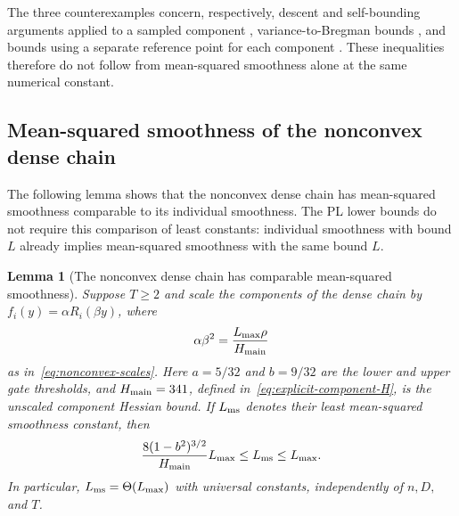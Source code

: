 \documentclass{article}
\newtheorem{lemma}[theorem]{Lemma}
\theoremstyle{definition}
\begin{document}
The three counterexamples concern, respectively, descent and self-bounding
arguments applied to a sampled component
\citep{vaswani2019painless,loizou2021stochastic,mishchenko2020random,kavis2022adaspider},
variance-to-Bregman bounds \citep{liu2022adaptive}, and bounds using
a separate reference point for each component \citep[Lemma~2]{defazio2014saga}.  These inequalities therefore do not
follow from mean-squared smoothness alone at the same numerical constant.

\subsection{Mean-squared smoothness of the nonconvex dense chain}

The following lemma shows that the nonconvex dense chain has mean-squared
smoothness comparable to its individual smoothness.  The PL lower bounds do
not require this comparison of least constants: individual smoothness with
bound $L$ already implies mean-squared smoothness with the same bound $L$.

\begin{lemma}[The nonconvex dense chain has comparable mean-squared smoothness]
\label{lem:dense-chain-ms}
Suppose $T\ge2$ and scale the components of the dense chain by
$f_i(y)=\alpha R_i(\beta y)$, where
\begin{equation}
 \alpha\beta^2=\frac{L_{\max}\rho}{H_{\rm main}}
 \label{eq:dense-chain-local-scaling-identity}
\end{equation}
as in~\eqref{eq:nonconvex-scales}.  Here $a=5/32$ and $b=9/32$ are the lower
and upper gate thresholds, and
$H_{\rm main}=341$, defined in~\eqref{eq:explicit-component-H}, is the
unscaled component Hessian bound.
If
$L_{\rm ms}$ denotes their least mean-squared smoothness constant, then
\begin{equation}
 \frac{8(1-b^2)^{3/2}}{H_{\rm main}}L_{\max}
 \le L_{\rm ms}\le L_{\max}.
 \label{eq:dense-chain-ms-comparison}
\end{equation}
In particular, $L_{\rm ms}=\Theta(L_{\max})$ with universal constants,
independently of $n,D,$ and $T$.
\end{lemma}
\end{document}

